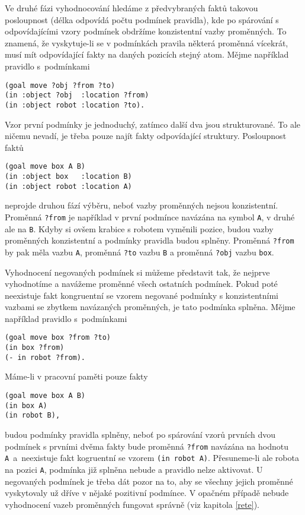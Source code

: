 Ve druhé fázi vyhodnocování hledáme z předvybraných faktů takovou posloupnost
(délka odpovídá počtu podmínek pravidla), kde po spárování s odpovídajícími
vzory podmínek obdržíme konzistentní vazby proměnných. To znamená, že
vyskytuje-li se v podmínkách pravila některá proměnná vícekrát, musí mít
odpovídající fakty na daných pozicích stejný atom. Mějme například pravidlo
s~podmínkami
\begin{verbatim}
(goal move ?obj ?from ?to)
(in :object ?obj  :location ?from)
(in :object robot :location ?to).
\end{verbatim}
Vzor první podmínky je jednoduchý, zatímco další dva jsou strukturované. To ale
ničemu nevadí, je třeba pouze najít fakty odpovídající struktury. Posloupnost
faktů
\begin{verbatim}
(goal move box A B)
(in :object box   :location B)
(in :object robot :location A)
\end{verbatim}
neprojde druhou fází výběru, neboť vazby proměnných nejsou konzistentní.
Proměnná \verb|?from| je například v první podmínce navázána na symbol \verb|A|, v
druhé ale na \verb|B|. Kdyby si ovšem krabice s robotem vyměnili pozice, budou
vazby proměnných konzistentní a podmínky pravidla budou splněny. Proměnná
\verb|?from| by pak měla vazbu \verb|A|, proměnná \verb|?to| vazbu
\verb|B| a proměnná \verb|?obj| vazbu \verb|box|.

Vyhodnocení negovaných podmínek si můžeme představit tak, že nejprve vyhodnotíme
a navážeme proměnné všech ostatních podmínek. Pokud poté neexistuje fakt
kongruentní se vzorem negované podmínky s konzistentními vazbami se zbytkem
navázaných proměnných, je tato podmínka splněna. Mějme například pravidlo
s~podmínkami
\begin{verbatim}
(goal move box ?from ?to)
(in box ?from)
(- in robot ?from).
\end{verbatim}
Máme-li v pracovní paměti pouze fakty
\begin{verbatim}
(goal move box A B)
(in box A)
(in robot B),
\end{verbatim}
budou podmínky pravidla splněny, neboť po spárování vzorů prvních dvou podmínek
s prvními dvěma fakty bude proměnná \verb|?from| navázána na hodnotu
\verb|A|~a~neexistuje fakt kogruentní se vzorem \verb|(in robot A)|.
Přesuneme-li ale robota na pozici \verb|A|, podmínka již splněna nebude a
pravidlo nelze aktivovat. U negovaných podmínek je třeba dát pozor na to, aby se
všechny jejich proměnné vyskytovaly už dříve v nějaké pozitivní podmínce. V
opačném případě nebude vyhodnocení vazeb proměnných fungovat správně (viz
kapitola \ref{rete}).

